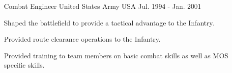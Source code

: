 \begin{cventries}
  \cventry
    {Combat Engineer} %
    {United States Army} %
    {USA} %
    {Jul. 1994 - Jan. 2001} %
    {
      \begin{cvitems} %
        \item {Shaped the battlefield to provide a tactical advantage to the Infantry.}
        \item {Provided route clearance operations to the Infantry.}
        \item {Provided training to team members on basic combat skills as well as MOS specific skills.}
      \end{cvitems}
    }

\end{cventries}
